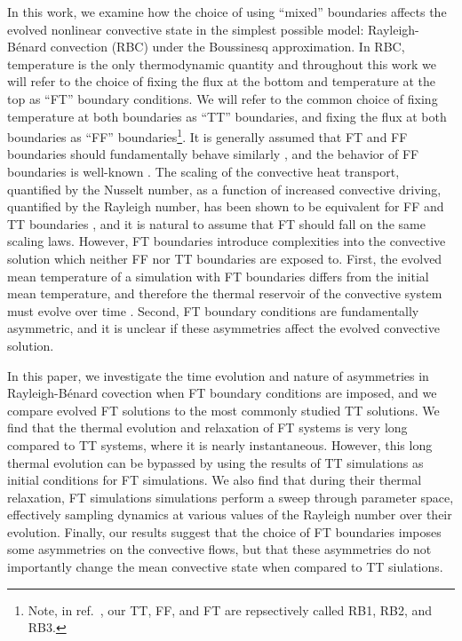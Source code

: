 \documentclass[aps, pre, onecolumn, nofootinbib, notitlepage, groupedaddress, amsfonts, amssymb, amsmath, longbibliography, superscriptaddress]{revtex4-1}
\newcommand{\RB}{Rayleigh-B\'{e}nard }
\begin{document}
In this work, we examine how the choice of using ``mixed'' boundaries affects the evolved nonlinear convective state in the simplest possible model: \RB convection (RBC) under the Boussinesq approximation.
In RBC, temperature is the only thermodynamic quantity and throughout this work we will refer to the choice of fixing the flux at the bottom and temperature at the top as ``FT'' boundary conditions.
We will refer to the common choice of fixing temperature at both boundaries as ``TT'' boundaries, and fixing the flux at both boundaries as ``FF'' boundaries\footnote{Note, in ref.~\cite{goluskin2015}, our TT, FF, and FT are repsectively called RB1, RB2, and RB3.}.
It is generally assumed that FT and FF boundaries should fundamentally behave similarly \cite{goluskin2015}, and the behavior of FF boundaries is well-known \cite{otero&all2002, johnston&doering2009}.
The scaling of the convective heat transport, quantified by the Nusselt number, as a function of increased convective driving, quantified by the Rayleigh number, has been shown to be equivalent for FF and TT boundaries \cite{johnston&doering2009}, and it is natural to assume that FT should fall on the same scaling laws.
However, FT boundaries introduce complexities into the convective solution which neither FF nor TT boundaries are exposed to.
First, the evolved mean temperature of a simulation with FT boundaries differs from the initial mean temperature, and therefore the thermal reservoir of the convective system must evolve over time \cite{anders&all2018}.
Second, FT boundary conditions are fundamentally asymmetric, and it is unclear if these asymmetries affect the evolved convective solution.

In this paper, we investigate the time evolution and nature of asymmetries in \RB covection when FT boundary conditions are imposed, and we compare evolved FT solutions to the most commonly studied TT solutions.
We find that the thermal evolution and relaxation of FT systems is very long compared to TT systems, where it is nearly instantaneous.
However, this long thermal evolution can be bypassed by using the results of TT simulations as initial conditions for FT simulations.
We also find that during their thermal relaxation, FT simulations simulations perform a sweep through parameter space, effectively sampling dynamics at various values of the Rayleigh number over their evolution.
Finally, our results suggest that the choice of FT boundaries imposes some asymmetries on the convective flows, but that these asymmetries do not importantly change the mean convective state when compared to TT siulations.
\end{document}
